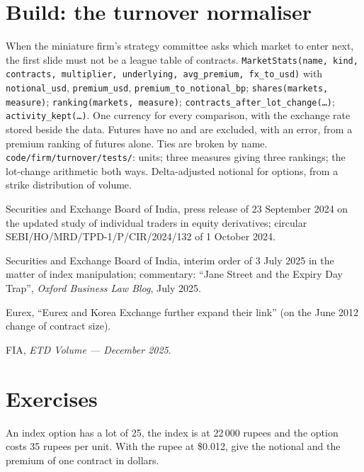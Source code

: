 \section{Build: the turnover normaliser}\label{bld:m1:options-markets-europe-asia:turnover}

\begin{build}
 When the miniature firm's strategy committee asks which
market to enter next, the first slide must not be a league table of
contracts.
 \texttt{MarketStats(name, kind, contracts, multiplier,
underlying, avg\_premium, fx\_to\_usd)} with \texttt{notional\_usd},
\texttt{premium\_usd}, \texttt{premium\_to\_notional\_bp};
\texttt{shares(markets, measure)}; \texttt{ranking(markets, measure)};
\texttt{contracts\_after\_lot\_change(\ldots)}; \texttt{activity\_kept(\ldots)}.
 One currency for every comparison, with the exchange rate
stored beside the data. Futures have no  and are excluded,
with an error, from a premium ranking of futures alone. Ties are broken by
name.
 \texttt{code/firm/turnover/tests/}: units; three
measures giving three rankings; the lot-change arithmetic both ways.
 Delta-adjusted notional for options, from a strike
distribution of volume.
\end{build}

\begin{omsources}
\item Securities and Exchange Board of India, press release of 23 September
2024 on the updated study of individual traders in equity derivatives;
circular SEBI/HO/MRD/TPD-1/P/CIR/2024/132 of 1 October 2024.
\item Securities and Exchange Board of India, interim order of 3 July 2025 in
the matter of index manipulation; commentary: ``Jane Street and the Expiry
Day Trap'', \emph{Oxford Business Law Blog}, July 2025.
\item Eurex, ``Eurex and Korea Exchange further expand their link'' (on the
June 2012 change of contract size).
\item FIA, \emph{ETD Volume --- December 2025}.
\end{omsources}

\section{Exercises}

\begin{exercise}[$\star$]\label{exo:m1:options-markets-europe-asia:1}
An index option has a lot of 25, the index is at 22\,000 rupees and the
option costs 35 rupees per unit. With the rupee at \$0.012, give the notional
and the premium of one contract in dollars.
\end{exercise}

